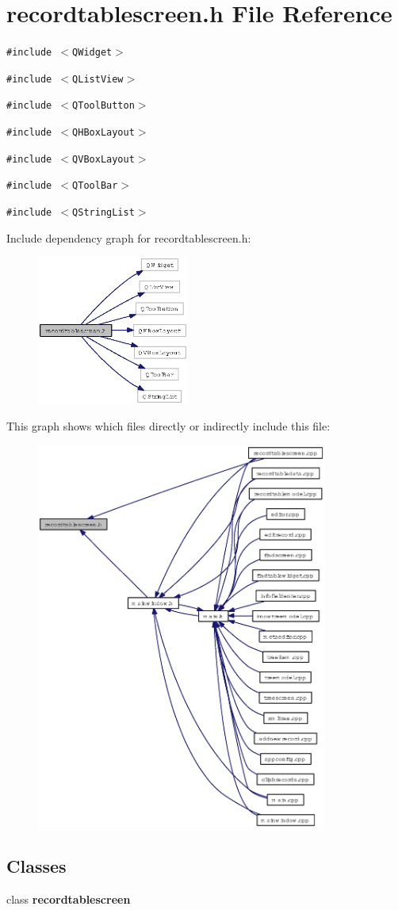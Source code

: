 \section{recordtablescreen.h File Reference}
\label{recordtablescreen_8h}
{\tt \#include $<$QWidget$>$}\par
{\tt \#include $<$QList\-View$>$}\par
{\tt \#include $<$QTool\-Button$>$}\par
{\tt \#include $<$QHBox\-Layout$>$}\par
{\tt \#include $<$QVBox\-Layout$>$}\par
{\tt \#include $<$QTool\-Bar$>$}\par
{\tt \#include $<$QString\-List$>$}\par


Include dependency graph for recordtablescreen.h:\begin{figure}[H]
\begin{center}
\leavevmode
\includegraphics[width=142pt]{recordtablescreen_8h__incl}
\end{center}
\end{figure}


This graph shows which files directly or indirectly include this file:\begin{figure}[H]
\begin{center}
\leavevmode
\includegraphics[width=271pt]{recordtablescreen_8h__dep__incl}
\end{center}
\end{figure}
\subsection*{Classes}
\begin{CompactItemize}
\item 
class {\bf recordtablescreen}
\end{CompactItemize}
